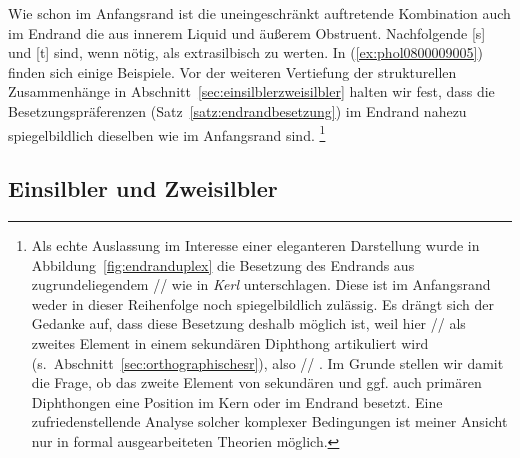 Wie schon im Anfangsrand ist die uneingeschränkt auftretende Kombination auch im Endrand die aus innerem Liquid und äußerem Obstruent.
Nachfolgende [s] und [t] sind, wenn nötig, als extrasilbisch zu werten.
In (\ref{ex:phol0800009005}) finden sich einige Beispiele.
Vor der weiteren Vertiefung der strukturellen Zusammenhänge in Abschnitt~\ref{sec:einsilblerzweisilbler} halten wir fest, dass die Besetzungspräferenzen (Satz~\ref{satz:endrandbesetzung}) im Endrand nahezu spiegelbildlich dieselben wie im Anfangsrand sind.%
\footnote{Als echte Auslassung im Interesse einer eleganteren Darstellung wurde in Abbildung~\ref{fig:endranduplex} die Besetzung des Endrands aus zugrundeliegendem // wie in \textit{Kerl} unterschlagen.
Diese ist im Anfangsrand weder in dieser Reihenfolge noch spiegelbildlich zulässig.
Es drängt sich der Gedanke auf, dass diese Besetzung deshalb möglich ist, weil hier // als zweites Element in einem sekundären Diphthong artikuliert wird (s.\ Abschnitt~\ref{sec:orthographischesr}), also // \phopro \textipa{[k\t{E@}l]}.
Im Grunde stellen wir damit die Frage, ob das zweite Element von sekundären und ggf. auch primären Diphthongen eine Position im Kern oder im Endrand besetzt. 
Eine zufriedenstellende Analyse solcher komplexer Bedingungen ist meiner Ansicht nur in formal ausgearbeiteten Theorien möglich.}

\begin{exe}
  \ex \label{ex:phol0800009005}
  \begin{xlist}
  \end{xlist}
\end{exe}


\subsection{Einsilbler und Zweisilbler}

